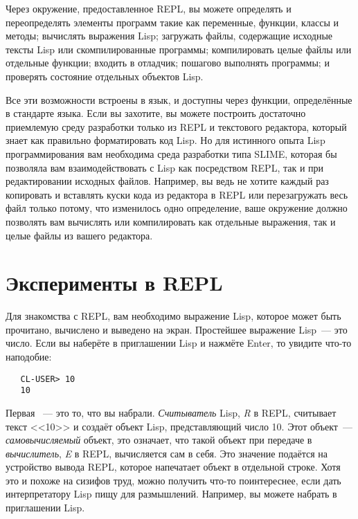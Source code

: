 Через окружение, предоставленное REPL, вы можете определять и переопределять элементы
программ такие как переменные, функции, классы и методы; вычислять выражения Lisp;
загружать файлы, содержащие исходные тексты Lisp или скомпилированные программы;
компилировать целые файлы или отдельные функции; входить в отладчик; пошагово выполнять
программы; и проверять состояние отдельных объектов Lisp.

Все эти возможности встроены в язык, и доступны через функции, определённые в стандарте
языка. Если вы захотите, вы можете построить достаточно приемлемую среду разработки только
из REPL и текстового редактора, который знает как правильно форматировать код Lisp. Но для
истинного опыта Lisp программирования вам необходима среда разработки типа SLIME, которая
бы позволяла вам взаимодействовать с Lisp как посредством REPL, так и при редактировании
исходных файлов. Например, вы ведь не хотите каждый раз копировать и вставлять куски
кода из редактора в REPL или перезагружать весь файл только потому, что изменилось одно
определение, ваше окружение должно позволять вам вычислять или компилировать как отдельные
выражения, так и целые файлы из вашего редактора.

\section{Эксперименты в REPL}

Для знакомства с REPL, вам необходимо выражение Lisp, которое может быть прочитано,
вычислено и выведено на экран. Простейшее выражение Lisp~--- это число. Если вы наберёте
 в приглашении Lisp и нажмёте Enter, то увидите что-то наподобие:

\begin{verbatim}
   CL-USER> 10
   10
\end{verbatim}

Первая ~--- это то, что вы набрали. \emph{Считыватель} Lisp, \emph{R} в REPL,
считывает текст <<10>> и создаёт объект Lisp, представляющий число 10. Этот объект~---
\emph{самовычисляемый} объект, это означает, что такой объект при передаче в \emph{вычислитель},
\emph{E} в REPL, вычисляется сам в себя. Это значение подаётся на устройство вывода REPL,
которое напечатает объект  в отдельной строке. Хотя это и похоже на сизифов труд, можно
получить что-то поинтереснее, если дать интерпретатору Lisp пищу для размышлений.
Например, вы можете набрать  в приглашении Lisp.

